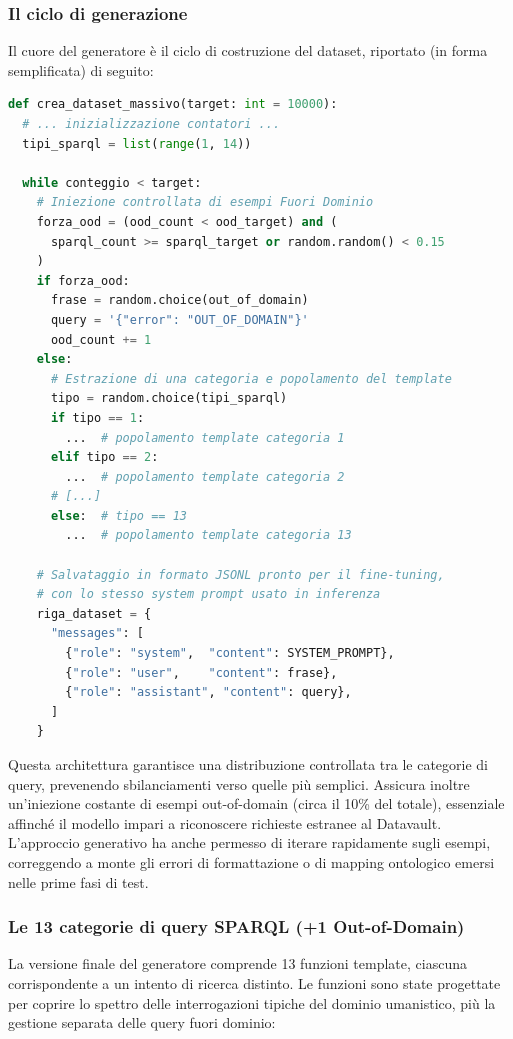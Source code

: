     \subsubsection{Il ciclo di generazione}
      Il cuore del generatore è il ciclo di costruzione del dataset, riportato (in forma semplificata) di seguito:

      \begin{lstlisting}[language=python, caption=Struttura del ciclo di generazione del dataset]
def crea_dataset_massivo(target: int = 10000):
  # ... inizializzazione contatori ...
  tipi_sparql = list(range(1, 14))

  while conteggio < target:
    # Iniezione controllata di esempi Fuori Dominio
    forza_ood = (ood_count < ood_target) and (
      sparql_count >= sparql_target or random.random() < 0.15
    )
    if forza_ood:
      frase = random.choice(out_of_domain)
      query = '{"error": "OUT_OF_DOMAIN"}'
      ood_count += 1
    else:
      # Estrazione di una categoria e popolamento del template
      tipo = random.choice(tipi_sparql)
      if tipo == 1:
        ...  # popolamento template categoria 1
      elif tipo == 2:
        ...  # popolamento template categoria 2
      # [...]
      else:  # tipo == 13
        ...  # popolamento template categoria 13

    # Salvataggio in formato JSONL pronto per il fine-tuning,
    # con lo stesso system prompt usato in inferenza
    riga_dataset = {
      "messages": [
        {"role": "system",  "content": SYSTEM_PROMPT},
        {"role": "user",    "content": frase},
        {"role": "assistant", "content": query},
      ]
    }
\end{lstlisting}

Questa architettura garantisce una distribuzione controllata tra le categorie di query, prevenendo sbilanciamenti verso quelle più semplici. Assicura inoltre un'iniezione costante di esempi out-of-domain (circa il 10\% del totale), essenziale affinché il modello impari a riconoscere richieste estranee al Datavault.
L'approccio generativo ha anche permesso di iterare rapidamente sugli esempi, correggendo a monte gli errori di formattazione o di mapping ontologico emersi nelle prime fasi di test.

\subsubsection{Le 13 categorie di query SPARQL (+1 Out-of-Domain)}

La versione finale del generatore comprende 13 funzioni template, ciascuna corrispondente a un intento di ricerca distinto. Le funzioni sono state progettate per coprire lo spettro delle interrogazioni tipiche del dominio umanistico, più la gestione separata delle query fuori dominio:

